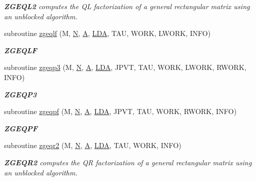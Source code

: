 \begin{DoxyCompactItemize}
\begin{DoxyCompactList}\small\item\em {\bfseries Z\+G\+E\+Q\+L2} computes the Q\+L factorization of a general rectangular matrix using an unblocked algorithm. \end{DoxyCompactList}\item 
subroutine \hyperlink{group__complex16GEcomputational_ga2c9504804543ffed09279bde84754e62}{zgeqlf} (M, \hyperlink{polmisc_8c_a0240ac851181b84ac374872dc5434ee4}{N}, \hyperlink{classA}{A}, \hyperlink{example__user_8c_ae946da542ce0db94dced19b2ecefd1aa}{L\+D\+A}, T\+A\+U, W\+O\+R\+K, L\+W\+O\+R\+K, I\+N\+F\+O)
\begin{DoxyCompactList}\small\item\em {\bfseries Z\+G\+E\+Q\+L\+F} \end{DoxyCompactList}\item 
subroutine \hyperlink{group__complex16GEcomputational_ga2b95c0e9330d8b3f0d9468d99c28d36e}{zgeqp3} (M, \hyperlink{polmisc_8c_a0240ac851181b84ac374872dc5434ee4}{N}, \hyperlink{classA}{A}, \hyperlink{example__user_8c_ae946da542ce0db94dced19b2ecefd1aa}{L\+D\+A}, J\+P\+V\+T, T\+A\+U, W\+O\+R\+K, L\+W\+O\+R\+K, R\+W\+O\+R\+K, I\+N\+F\+O)
\begin{DoxyCompactList}\small\item\em {\bfseries Z\+G\+E\+Q\+P3} \end{DoxyCompactList}\item 
subroutine \hyperlink{group__complex16GEcomputational_ga081af8445fcaa6804c99c11b280a60c3}{zgeqpf} (M, \hyperlink{polmisc_8c_a0240ac851181b84ac374872dc5434ee4}{N}, \hyperlink{classA}{A}, \hyperlink{example__user_8c_ae946da542ce0db94dced19b2ecefd1aa}{L\+D\+A}, J\+P\+V\+T, T\+A\+U, W\+O\+R\+K, R\+W\+O\+R\+K, I\+N\+F\+O)
\begin{DoxyCompactList}\small\item\em {\bfseries Z\+G\+E\+Q\+P\+F} \end{DoxyCompactList}\item 
subroutine \hyperlink{group__complex16GEcomputational_ga5b3713deac5bd2bda6844fa1d896f162}{zgeqr2} (M, \hyperlink{polmisc_8c_a0240ac851181b84ac374872dc5434ee4}{N}, \hyperlink{classA}{A}, \hyperlink{example__user_8c_ae946da542ce0db94dced19b2ecefd1aa}{L\+D\+A}, T\+A\+U, W\+O\+R\+K, I\+N\+F\+O)
\begin{DoxyCompactList}\small\item\em {\bfseries Z\+G\+E\+Q\+R2} computes the Q\+R factorization of a general rectangular matrix using an unblocked algorithm. \end{DoxyCompactList}\item 

\end{DoxyCompactItemize}
